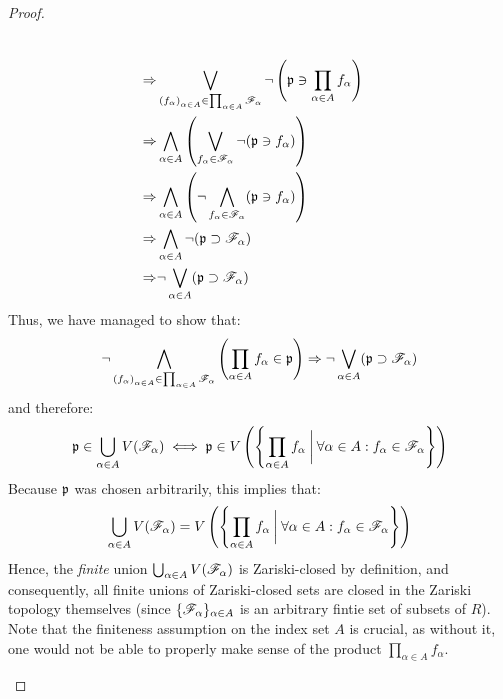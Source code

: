 \begin{proof}
\begin{enumerate}
$$\begin{aligned}
                                        \\
                                        \Rightarrow & \bigvee_{\left(f_{\alpha}\right)_{\alpha \in A} \in \prod_{\alpha \in A} \mathscr{F}_{\alpha}} \neg \left(\mathfrak{p} \ni \prod_{\alpha \in A} f_{\alpha}\right)
                                        \\
                                        \Rightarrow & \bigwedge_{\alpha \in A} \left(\bigvee_{f_{\alpha} \in \mathscr{F}_{\alpha}} \neg(\mathfrak{p} \ni f_{\alpha})\right)
                                        \\
                                        \Rightarrow & \bigwedge_{\alpha \in A} \left(\neg \bigwedge_{f_{\alpha} \in \mathscr{F}_{\alpha}} (\mathfrak{p} \ni f_{\alpha})\right)
                                        \\
                                        \Rightarrow & \bigwedge_{\alpha \in A} \neg (\mathfrak{p} \supset \mathscr{F}_{\alpha})
                                        \\
                                        \Rightarrow & \neg \bigvee_{\alpha \in A} (\mathfrak{p} \supset \mathscr{F}_{\alpha})
                                    \end{aligned}
                                $$
                            Thus, we have managed to show that:
                                $$\neg \bigwedge_{\left(f_{\alpha}\right)_{\alpha \in A} \in \prod_{\alpha \in A} \mathscr{F}_{\alpha}} \left(\prod_{\alpha \in A} f_{\alpha} \in \mathfrak{p}\right) \Rightarrow  \neg \bigvee_{\alpha \in A} (\mathfrak{p} \supset \mathscr{F}_{\alpha})$$
                            and therefore:
                                $$\mathfrak{p} \in \bigcup_{\alpha \in A} V(\mathscr{F}_{\alpha}) \iff \mathfrak{p} \in V\left(\left\{\prod_{\alpha \in A} f_{\alpha} \: \bigg| \: \forall \alpha \in A: f_{\alpha} \in \mathscr{F}_{\alpha} \right\}\right)$$
                            Because $\mathfrak{p}$ was chosen arbitrarily, this implies that:
                                $$\bigcup_{\alpha \in A} V(\mathscr{F}_{\alpha}) = V\left(\left\{\prod_{\alpha \in A} f_{\alpha} \: \bigg| \: \forall \alpha \in A: f_{\alpha} \in \mathscr{F}_{\alpha} \right\}\right)$$
                            Hence, the \textit{finite} union $\bigcup_{\alpha \in A} V(\mathscr{F}_{\alpha})$ is Zariski-closed by definition, and consequently, all finite unions of Zariski-closed sets are closed in the Zariski topology themselves (since $\{\mathscr{F}_{\alpha}\}_{\alpha \in A}$ is an arbitrary fintie set of subsets of $R$). Note that the finiteness assumption on the index set $A$ is crucial, as without it, one would not be able to properly make sense of the product $\prod_{\alpha \in A} f_{\alpha}$.

\end{enumerate}
\end{proof}
